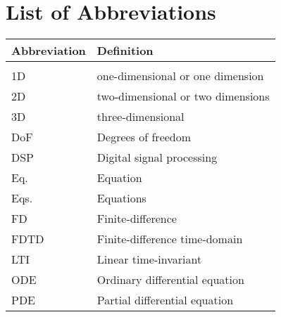 \chapter*{List of Abbreviations}
{\centering\renewcommand{\arraystretch}{1.1}
\begin{longtable}{ p{3cm} p{8cm}}
 Abbreviation & Definition\\
 \hline\\
 \endhead
 1D & one-dimensional or one dimension\\
 2D & two-dimensional or two dimensions\\
 3D & three-dimensional \\
 DoF & Degrees of freedom \\
 DSP & Digital signal processing \\
 Eq. & Equation \\
 Eqs. & Equations\\
 FD & Finite-difference\\
 FDTD & Finite-difference time-domain\\
 LTI & Linear time-invariant\\
 ODE & Ordinary differential equation\\
 PDE & Partial differential equation
\end{longtable}}
